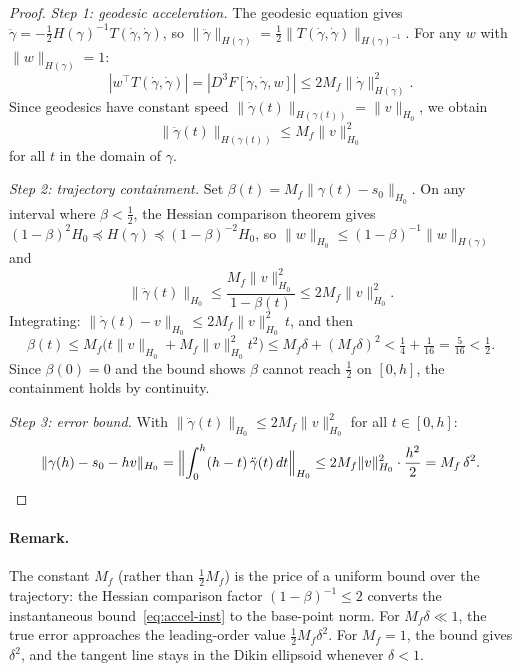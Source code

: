 \documentclass[11pt]{article}
\begin{document}
\begin{proof}
\textit{Step 1: geodesic acceleration.}\quad
The geodesic equation gives $\ddot\gamma = -\frac{1}{2}H(\gamma)^{-1}
T(\dot\gamma,\dot\gamma)$, so $\|\ddot\gamma\|_{H(\gamma)}
= \frac{1}{2}\|T(\dot\gamma,\dot\gamma)\|_{H(\gamma)^{-1}}$.
For any $w$ with $\|w\|_{H(\gamma)} = 1$:
\[
  |w^\top T(\dot\gamma,\dot\gamma)|
  = |D^3F[\dot\gamma,\dot\gamma,w]|
  \leq 2M_f\|\dot\gamma\|_{H(\gamma)}^2.
\]
Since geodesics have constant speed
$\|\dot\gamma(t)\|_{H(\gamma(t))} = \|v\|_{H_0}$, we obtain
\begin{equation}\label{eq:accel-inst}
  \|\ddot\gamma(t)\|_{H(\gamma(t))} \leq M_f\|v\|_{H_0}^2
\end{equation}
for all $t$ in the domain of $\gamma$.

\medskip\noindent
\textit{Step 2: trajectory containment.}\quad
Set $\beta(t) = M_f\|\gamma(t) - s_0\|_{H_0}$.  On any interval
where $\beta < \frac{1}{2}$, the Hessian comparison theorem gives
$(1-\beta)^2 H_0 \preceq H(\gamma) \preceq (1-\beta)^{-2}H_0$, so
$\|w\|_{H_0} \leq (1-\beta)^{-1}\|w\|_{H(\gamma)}$ and
\[
  \|\ddot\gamma(t)\|_{H_0}
  \leq \frac{M_f\|v\|_{H_0}^2}{1-\beta(t)}
  \leq 2M_f\|v\|_{H_0}^2.
\]
Integrating: $\|\dot\gamma(t) - v\|_{H_0}
\leq 2M_f\|v\|_{H_0}^2\,t$, and then
\[
  \beta(t) \leq M_f\bigl(t\|v\|_{H_0} + M_f\|v\|_{H_0}^2 t^2\bigr)
  \leq M_f\delta + (M_f\delta)^2
  < \tfrac{1}{4} + \tfrac{1}{16}
  = \tfrac{5}{16} < \tfrac{1}{2}.
\]
Since $\beta(0) = 0$ and the bound shows $\beta$ cannot reach
$\frac{1}{2}$ on $[0,h]$, the containment holds by continuity.

\medskip\noindent
\textit{Step 3: error bound.}\quad
With $\|\ddot\gamma(t)\|_{H_0} \leq 2M_f\|v\|_{H_0}^2$ for all
$t \in [0,h]$:
\[
  \|\gamma(h) - s_0 - hv\|_{H_0}
  = \Bigl\|\int_0^h (h-t)\,\ddot\gamma(t)\,dt\Bigr\|_{H_0}
  \leq 2M_f\|v\|_{H_0}^2 \cdot \frac{h^2}{2}
  = M_f\,\delta^2. \qedhere
\]
\end{proof}

\paragraph{Remark.}
The constant $M_f$ (rather than $\frac{1}{2}M_f$) is the price of
a uniform bound over the trajectory: the Hessian comparison
factor $(1-\beta)^{-1} \leq 2$ converts the
instantaneous bound~\eqref{eq:accel-inst} to the base-point norm.
For $M_f\delta \ll 1$, the true error approaches the leading-order
value $\frac{1}{2}M_f\delta^2$.  For $M_f = 1$, the bound gives
$\delta^2$, and the tangent line stays in the Dikin ellipsoid
whenever $\delta < 1$.
\end{document}
